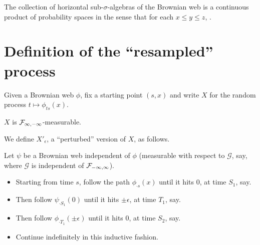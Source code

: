 {\begin{theorem}
  The collection of horizontal sub-$\sigma$-algebras of the Brownian
  web is a continuous product of probability spaces in the sense that
  for each $x \le y \le z$,  .
\end{theorem}

\section{Definition of the ``resampled'' process}

\newcommand{\sampled}{X}
\newcommand{\resamplede}{X'_{\epsilon}}
\newcommand{\reservoir}{\mathcal{G}}

\newcommand{\twostrips}{\commafactor{\infty}{0} \tensor \commafactor{0}{-\infty}}
\newcommand{\onestrip}{\commafactor{\infty}{-\infty}}
\newcommand{\twostripsreservoir}{\twostrips \tensor \reservoir}

\begin{definition}
Given a Brownian web $\phi$, fix a starting point $(s,x)$ and write
$\sampled$ for the random process $t \mapsto \phi_{ts}(x)$.
\end{definition}

\begin{obs}
  $\sampled$ is $\onestrip$-measurable.
\end{obs}

\begin{definition}
  \newcommand{\webt}{\psi}

  We define $\resamplede$, a ``perturbed'' version of $\sampled$, as
  follows.

  Let $\webt$ be a Brownian web independent of $\phi$ (measurable with
  respect to $\reservoir$, say, where $\reservoir$ is independent of
  $\mathcal{F}_{-\infty,\infty}$).

  \begin{itemize}
  \item Starting from time $s$, follow the path $\phi_{\cdot s}(x)$
    until it hits $0$, at time $S_1$, say.
  \item Then follow $\webt_{\cdot S_1}(0)$ until it hits $\pm \epsilon$, at
    time $T_1$, say.
  \item Then follow $\phi_{\cdot T_1}(\pm \epsilon)$ until it hits $0$, at
    time $S_2$, say.
  \item Continue indefinitely in this inductive fashion.
  \end{itemize}
\end{definition}

}
